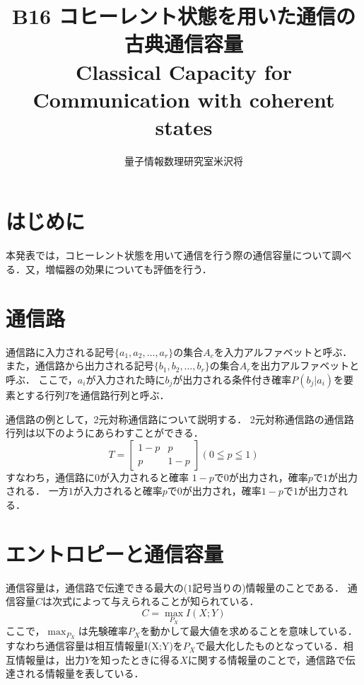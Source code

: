 \documentclass[a4j,twocolumn]{jarticle}
\title{\vspace{-2em}B16 コヒーレント状態を用いた通信の古典通信容量\\
\vspace{0.5cm}
\normalsize{Classical Capacity for Communication with coherent states}}
\date{}
\author{量子情報数理研究室\hspace{50mm}米沢将}
\def \figref #1{\figurename\ref{#1}}
\begin{document}
\maketitle
\thispagestyle{empty}
\section{はじめに}
本発表では，コヒーレント状態を用いて通信を行う際の通信容量について調べる．又，増幅器の効果についても評価を行う．

\section{通信路}
通信路に入力される記号$\{a_1,a_2,…,a_r\}$の集合$A_c$を入力アルファベットと呼ぶ．また，通信路から出力される記号$\{b_1,b_2,…,b_r\}$の集合$A_r$を出力アルファベットと呼ぶ．
ここで，$a_i$が入力された時に$b_j$が出力される条件付き確率$P(b_j|a_i)$を要素とする行列$T$を通信路行列と呼ぶ．

通信路の例として，2元対称通信路について説明する．
2元対称通信路の通信路行列は以下のようにあらわすことができる．
$$
T=\begin{bmatrix}
1-p&p\\
p&1-p
\end{bmatrix}
(0≦p≦1)$$ 
すなわち，通信路に$0$が入力されると確率 $1-p$で$0$が出力され，確率$p$で$1$が出力される．
一方$1$が入力されると確率$p$で$0$が出力され，確率$1-p$で$1$が出力される．



\section{エントロピーと通信容量}
通信容量は，通信路で伝達できる最大の($1$記号当りの)情報量のことである．
通信容量$C$は次式によって与えられることが知られている．
\begin{equation}\label{Cap}
C=\max_{P_X}I(X;Y)　　
\end{equation}
ここで，$\max_{P_X}$は先験確率$P_X$を動かして最大値を求めることを意味している．
すなわち通信容量は相互情報量I(X;Y)を$P_X$で最大化したものとなっている．相互情報量は，出力$Y$を知ったときに得る$X$に関する情報量のことで，通信路で伝達される情報量を表している．
\end{document}
